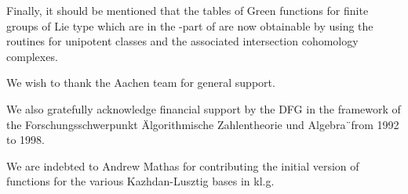 Finally,  it should  be mentioned  that the  tables of  Green functions for
finite  groups of Lie type which are  in the {\MAPLE}-part of {\CHEVIE} are
now  obtainable by using  the {\CHEVIE} routines  for unipotent classes and
the associated intersection cohomology complexes.

 We  wish to thank  the Aachen {\GAP} team
for general support.

We  also  gratefully  acknowledge  financial  support  by  the  DFG  in the
framework  of the Forschungsschwerpunkt  \"Algorithmische Zahlentheorie und
Algebra\"\ from 1992 to 1998.

We  are indebted to  Andrew Mathas for  contributing the initial version of
functions for the various Kazhdan-Lusztig bases in kl.g.
